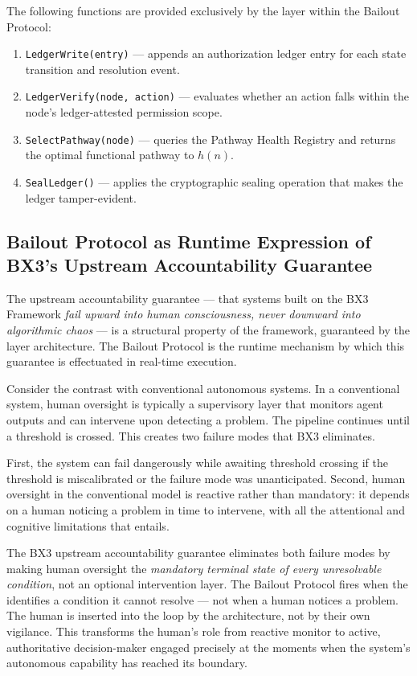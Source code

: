 The following functions are provided exclusively by the \fact{} layer within the Bailout Protocol:

\begin{enumerate}
\item \texttt{LedgerWrite(entry)} — appends an authorization ledger entry for each state transition and resolution event.
\item \texttt{LedgerVerify(node, action)} — evaluates whether an action falls within the node's ledger-attested permission scope.
\item \texttt{SelectPathway(node)} — queries the Pathway Health Registry and returns the optimal functional pathway to $h(n)$.
\item \texttt{SealLedger()} — applies the cryptographic sealing operation that makes the ledger tamper-evident.
\end{enumerate}

\subsection{Bailout Protocol as Runtime Expression of BX3's Upstream Accountability Guarantee}
\label{sec:runtime-expression}

The upstream accountability guarantee — that systems built on the BX3 Framework \textit{fail upward into human consciousness, never downward into algorithmic chaos} — is a structural property of the framework, guaranteed by the layer architecture. The Bailout Protocol is the runtime mechanism by which this guarantee is effectuated in real-time execution.

Consider the contrast with conventional autonomous systems. In a conventional system, human oversight is typically a supervisory layer that monitors agent outputs and can intervene upon detecting a problem. The pipeline continues until a threshold is crossed. This creates two failure modes that BX3 eliminates.

First, the system can fail dangerously while awaiting threshold crossing if the threshold is miscalibrated or the failure mode was unanticipated. Second, human oversight in the conventional model is reactive rather than mandatory: it depends on a human noticing a problem in time to intervene, with all the attentional and cognitive limitations that entails.

The BX3 upstream accountability guarantee eliminates both failure modes by making human oversight the \textit{mandatory terminal state of every unresolvable condition}, not an optional intervention layer. The Bailout Protocol fires when the \bounds{} identifies a condition it cannot resolve — not when a human notices a problem. The human is inserted into the loop by the architecture, not by their own vigilance. This transforms the human's role from reactive monitor to active, authoritative decision-maker engaged precisely at the moments when the system's autonomous capability has reached its boundary.


